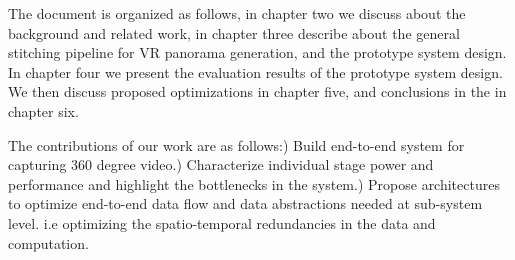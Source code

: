 

The document is organized as follows, in chapter two we discuss about the background and related work, in chapter three describe about the general stitching pipeline for VR panorama generation, and the prototype system design. In chapter four we present the evaluation results of the prototype system design. We then discuss proposed optimizations in chapter five, and conclusions in the  in chapter six.

The contributions of our work are as follows:) Build end-to-end system for capturing 360 degree video.) Characterize individual stage power and performance and highlight the bottlenecks in the system.) Propose architectures to optimize end-to-end data flow and data abstractions needed at sub-system level. i.e optimizing the spatio-temporal redundancies in the data and computation.\newline




